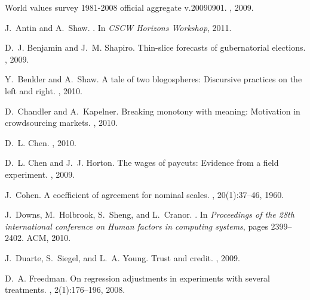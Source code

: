 \documentclass{cscw2010}
\begin{document}
\begin{thebibliography}{10}

World values survey 1981-2008 official aggregate v.20090901.
, 2009.

J.~Antin and A.~Shaw.
.
\newblock In {\em CSCW Horizons Workshop}, 2011.

D.~J. Benjamin and J.~M. Shapiro.
\newblock Thin-slice forecasts of gubernatorial elections.
, 2009.

Y.~Benkler and A.~Shaw.
\newblock A tale of two blogospheres: Discursive practices on the left and
  right.
,
  2010.

D.~Chandler and A.~Kapelner.
\newblock Breaking monotony with meaning: Motivation in crowdsourcing markets.
, 2010.

D.~L. Chen.
, 2010.

D.~L. Chen and J.~J. Horton.
\newblock The wages of paycuts: Evidence from a field experiment.
, 2009.

J.~Cohen.
\newblock A coefficient of agreement for nominal scales.
, 20(1):37--46, 1960.

J.~Downs, M.~Holbrook, S.~Sheng, and L.~Cranor.
.
\newblock In {\em Proceedings of the 28th international conference on Human
  factors in computing systems}, pages 2399--2402. ACM, 2010.

J.~Duarte, S.~Siegel, and L.~A. Young.
\newblock Trust and credit.
, 2009.

D.~A. Freedman.
\newblock On regression adjustments in experiments with several treatments.
, 2(1):176--196, 2008.


\end{thebibliography}
\end{document}
